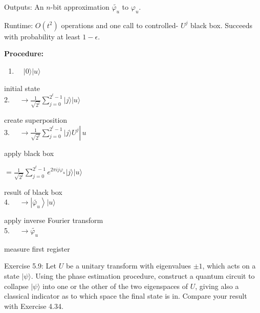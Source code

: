 Outputs: An $n$-bit approximation $\widetilde{\varphi_{u}}$ to $\varphi_{u}$.

Runtime: $O\left(t^{2}\right)$ operations and one call to controlled- $U^{j}$ black box. Succeeds with probability at least $1-\epsilon$.

\textbf{Procedure:}
\begin{enumerate}
  \item $\quad|0\rangle|u\rangle$
\end{enumerate}

initial state\\
2. $\quad \rightarrow \frac{1}{\sqrt{2^{t}}} \sum_{j=0}^{2^{t}-1}|j\rangle|u\rangle$

create superposition\\
3. $\left.\quad \rightarrow \frac{1}{\sqrt{2^{t}}} \sum_{j=0}^{2^{t}-1}|j\rangle U^{j} \right\rvert\, u$

apply black box

$=\frac{1}{\sqrt{2^{t}}} \sum_{j=0}^{2^{t}-1} e^{2 \pi i j \varphi_{u}}|j\rangle|u\rangle$

result of black box\\
4. $\quad \rightarrow\left|\widetilde{\varphi_{u}}\right\rangle|u\rangle$

apply inverse Fourier transform\\
5. $\quad \rightarrow \widetilde{\varphi_{u}}$

measure first register

Exercise 5.9: Let $U$ be a unitary transform with eigenvalues $\pm 1$, which acts on a state $|\psi\rangle$. Using the phase estimation procedure, construct a quantum circuit to collapse $|\psi\rangle$ into one or the other of the two eigenspaces of $U$, giving also a\\
classical indicator as to which space the final state is in. Compare your result with Exercise 4.34.